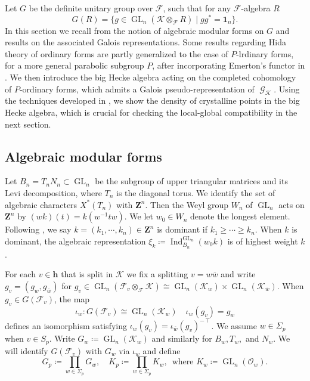 \documentclass[leqno]{amsart}
\theoremstyle{definition}
\theoremstyle{remark}
\newcommand{\id}{\mathbf{1}}
\newcommand{\oo}{\mathcal{O}}
\newcommand{\Z}{{\mathbf{Z}}}
\newcommand{\finite}{\mathbf{h}}
\DeclareMathOperator{\Ind}{Ind}
\DeclareMathOperator{\GL}{GL}
\DeclareMathOperator{\Gal}{\mathcal{G}}
\newcommand{\F}{{\mathcal{F}}} %
\newcommand{\K}{{\mathcal{K}}} %
\newcommand{\bw}{\overline{w}}
\begin{document}
Let $G$ be the definite unitary group over $\F$,
such that for any $\F$-algebra $R$
\begin{equation}\label{def:def_unitary}
    G(R)=\{g\in \GL_{n}(\K\otimes_\F R) \mid gg^*=\id_n\}.
\end{equation}
In this section we recall from \cite{ger}
the notion of algebraic modular forms on $G$
and results on the associated Galois representations.
Some results 
regarding Hida theory of ordinary forms
are partly generalized
to the case of $P$-lrdinary forms,
for a more general parabolic subgroup $P$,
after incorporating Emerton's functor in \cite{emeI}.
We then introduce 
the big Hecke algebra acting on 
the completed cohomology of $P$-ordinary forms,
which admits a Galois pseudo-representation
of $\Gal_\K$.
Using the techniques developed in \cite{pan},
we show the density
of crystalline points in the big Hecke algebra,
which is crucial for checking 
the local-global compatibility in the next section.


\subsection{Algebraic modular forms}

Let $B_n=T_nN_n\subset \GL_n$ be the subgroup of
upper triangular matrices and its Levi decomposition,
where $T_n$ is the diagonal torus.
We identify the set of algebraic characters $X^*(T_n)$
with  $\Z^n$.
Then the Weyl group $W_n$ of $\GL_n$
acts on $\Z^n$ by $(wk)(t)=k(w^{-1}tw)$.
We let $w_0\in W_n$ denote the longest element.
Following \cite[Def 2.3]{ger},
we say $k=(k_1,\cdots,k_n)\in \Z^n$
is dominant if $k_1\geq \cdots\geq k_n$.
When $k$ is dominant,
the algebraic representation 
$\xi_k\coloneqq \Ind_{B_n}^{\GL_n}(w_0k)$
is of highest weight $k$.



For each $v\in\finite$ that is split in $\K$
we fix a splitting $v=w\bw$
and write $g_v=(g_w,g_{\bw})$
for $g_v\in \GL_n(\F_v\otimes_\F\K)\cong \GL_n(\K_w)\times\GL_n(\K_{\bw})$.
When $g_v\in G(\F_v)$, the map
\begin{equation}
\iota_w\colon G(\F_v)\cong \GL_n(\K_w)\quad
\iota_w(g_v)=g_w
\end{equation}
defines an isomorphism satisfying
$\iota_w(g_v)=\iota_{\bw}(g_v)^{-\intercal}$.
We assume $w\in \Sigma_p$ when $v\in S_p$.
Write $G_{w}\coloneqq\GL_n(\K_w)$ and similarly 
for $B_w, T_w,$ and $N_w$. 
We will identify $G(\F_v)$ with $G_w$ 
via $\iota_w$ and define 
\[
	G_p\coloneqq\prod_{w\in \Sigma_p}G_w,\quad
	K_p\coloneqq\prod_{w\in \Sigma_p}K_w,\, \text{ where }
	K_w\coloneqq\GL_n(\oo_w).
\]
\end{document}
